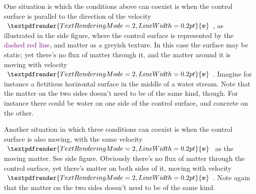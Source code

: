 \documentclass[a4paper,12pt,%
onecolumn,oneside,%
british%
]{memoir}
\renewcommand*{\bm}[1]{\textpdfrender{TextRenderingMode=2,LineWidth=0.2pt}{\boldsymbol{#1}}}
\renewcommand*{\|}[1][]{\nonscript\:#1\vert\nonscript\:\mathopen{}}
\newcommand*{\yv}{\bm{v}}
\begin{document}
%
%
One situation is which the conditions above can coexist is when the control surface is parallel to the direction of the velocity $\yv$, as illustrated in the side figure, where the control surface is represented by the \textcolor{purple}{dashed red line}, and matter as a \textcolor{midgrey}{greyish texture}. In this case the surface may be static; yet there's no flux of matter through it, and the matter around it is moving with velocity $\yv$. Imagine for instance a fictitious horizontal surface in the middle of a water stream. Note that the matter on the two sides doesn't need to be of the same kind, though. For instance there could be water on one side of the control surface, and concrete on the other.

%
%
Another situation in which three conditions can coexist is when the control surface is also moving, with the same velocity $\yv$ as the moving matter. See side figure. Obviously there's no flux of matter through the control surface, yet there's matter on both sides of it, moving with velocity $\yv$. Note again that the matter on the two sides doesn't need to be of the same kind.
\end{document}
